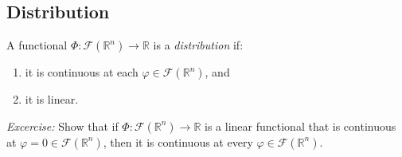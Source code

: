 \documentclass[aps,prl,twocolumn,groupedaddress]{revtex4-2}
\newcommand{\RR}{\mathbb{R}}
\begin{document}
\subsection{Distribution}

A functional $\Phi:\mathcal{F}(\RR^n) \to \RR$ is a {\em distribution} if:
\begin{enumerate}
\item it is continuous at each $\varphi\in \mathcal{F}(\RR^n)$, and
\item it is linear.
\end{enumerate}

{\em Excercise:}
Show that if $\Phi:\mathcal{F}(\RR^n)\to \RR$ is a linear functional that is continuous at $\varphi=0\in \mathcal{F}(\RR^n)$, then it is continuous at every $\varphi\in \mathcal{F}(\RR^n)$.
\end{document}
